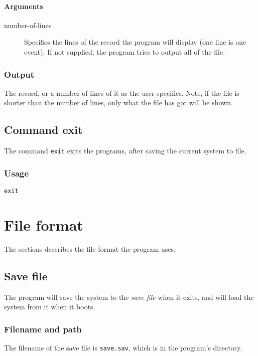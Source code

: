 \paragraph{Arguments}
\begin{description}
	\item[number-of-lines] Specifies the lines of the record the program will display (one line is one event). If not supplied, the program tries to output all of the file.
\end{description}

\subsubsection{Output}
The record, or a number of lines of it as the user specifies. Note, if the file is shorter than the number of lines, only what the file has got will be shown.

\subsection{Command exit}
The command \texttt{exit} exits the programs, after saving the current system to file.

\subsubsection{Usage}
\begin{center}
	\texttt{exit}
\end{center}

\section{File format}
The sections describes the file format the program uses.

\subsection{Save file}
The program will save the system to the \emph{save file} when it exits, and will load the system from it when it boots.

\subsubsection{Filename and path}
The filename of the save file is \texttt{save.sav}, which is in the program's directory.

